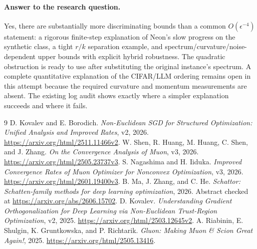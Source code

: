 \documentclass[11pt]{article}
\begin{document}
\paragraph{Answer to the research question.}
Yes, there are substantially more discriminating bounds than a common
$O(\epsilon^{-4})$ statement: a rigorous finite-step explanation of Neon's
slow progress on the synthetic class, a tight $r/k$ separation example,
and spectrum/curvature/noise-dependent upper bounds with explicit hybrid
robustness. The quadratic obstruction is ready to use after substituting
the original instance's spectrum. A complete quantitative explanation of
the CIFAR/LLM ordering remains open in this attempt because the required
curvature and momentum measurements are absent. The existing log audit
shows exactly where a simpler explanation succeeds and where it fails.

\begin{thebibliography}{9}
 D. Kovalev and E. Borodich.
\emph{Non-Euclidean SGD for Structured Optimization: Unified Analysis and
Improved Rates}, v2, 2026.
\url{https://arxiv.org/html/2511.11466v2}.
 W. Shen, R. Huang, M. Huang, C. Shen, and J. Zhang.
\emph{On the Convergence Analysis of Muon}, v3, 2026.
\url{https://arxiv.org/html/2505.23737v3}.
 S. Nagashima and H. Iiduka.
\emph{Improved Convergence Rates of Muon Optimizer for Nonconvex Optimization},
v3, 2026. \url{https://arxiv.org/html/2601.19400v3}.
 B. Ma, J. Zhang, and C. He.
\emph{Schattor: Schatten-family methods for deep learning optimization},
2026. Abstract checked at \url{https://arxiv.org/abs/2606.15702}.
 D. Kovalev.
\emph{Understanding Gradient Orthogonalization for Deep Learning via
Non-Euclidean Trust-Region Optimization}, v2, 2025.
\url{https://arxiv.org/html/2503.12645v2}.
 A. Riabinin, E. Shulgin, K. Gruntkowska, and P. Richtarik.
\emph{Gluon: Making Muon \& Scion Great Again!}, 2025.
\url{https://arxiv.org/html/2505.13416}.
\end{thebibliography}
\end{document}
